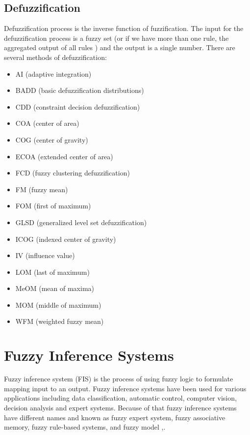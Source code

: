 \documentclass{article}
\begin{document}
\subsection{Defuzzification}
Defuzzification process is the inverse function of fuzzification.
The input for the defuzzification process is a fuzzy set (or if we have more than one rule, the aggregated output of all rules ) and the output is a single number. 
There are several methods of defuzzification\cite{Defuzzification_criteria_and_classification}:

\begin{itemize}\label{list_of_possible_defuzzification}
\item AI (adaptive integration)
\item BADD (basic defuzzification distributions)
\item CDD (constraint decision defuzzification)
\item COA (center of area)
\item COG (center of gravity)
\item ECOA (extended center of area)
\item FCD (fuzzy clustering defuzzification)
\item FM (fuzzy mean)
\item FOM (first of maximum)
\item GLSD (generalized level set defuzzification)
\item ICOG (indexed center of gravity)
\item IV (influence value)
\item LOM (last of maximum)
\item MeOM (mean of maxima)
\item MOM (middle of maximum)
\item WFM (weighted fuzzy mean)
\end{itemize}




\section{Fuzzy Inference Systems}\label{Fuzzy_Inference_Systems}
Fuzzy inference system (FIS) is  the process of using fuzzy logic to formulate  mapping  input to an output.
Fuzzy inference systems have been used for various applications including
data classification, automatic control, computer vision, decision analysis and expert systems.
Because of that fuzzy inference systems have different names  and known as fuzzy expert system,
fuzzy associative memory, fuzzy rule-based systems, and fuzzy model 
\cite{Introduction_to_Fuzzy_Logic_using_MATLAB},\cite{Fuzzy_Logic_Toolbox_For_Use_with_MATLAB}.
\end{document}
